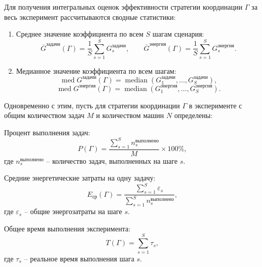 Для получения интегральных оценок эффективности стратегии координации $\Gamma$ за весь эксперимент рассчитываются сводные статистики:

\begin{enumerate}[beginpenalty=10000, midpenalty=10000, wide=\parindent, leftmargin=0pt]
	\item Среднее значение коэффициента по всем $S$ шагам сценария:
\begin{equation}
	\overline{G}^{\text{задачи}}(\Gamma) = \frac{1}{S} \sum_{s=1}^{S} G^{\text{задачи}}_s, \qquad
	\overline{G}^{\text{энергия}}(\Gamma) = \frac{1}{S} \sum_{s=1}^{S} G^{\text{энергия}}_s.
\end{equation}

	\item Медианное значение коэффициента по всем шагам:
\begin{equation}
	\operatorname{med} G^{\text{задачи}}(\Gamma) = \operatorname{median}\left( G^{\text{задачи}}_1, \dots, G^{\text{задачи}}_S \right),
\end{equation}
\begin{equation}
	\operatorname{med} G^{\text{энергия}}(\Gamma) = \operatorname{median}\left( G^{\text{энергия}}_1, \dots, G^{\text{энергия}}_S \right).
\end{equation}
\end{enumerate}

Одновременно с этим, пусть для стратегии координации $\Gamma$ в эксперименте с общим количеством задач $M$ и количеством машин $N$ определены:

Процент выполнения задач:
\begin{equation}
	P(\Gamma) = \frac{\displaystyle \sum_{s=1}^{S} n_s^{\text{выполнено}}}{M} \times 100\%,
\end{equation}
где $n_s^{\text{выполнено}}$ -- количество задач, выполненных на шаге $s$.

Средние энергетические затраты на одну задачу:
\begin{equation}
	E_{\text{ср}}(\Gamma) = \frac{\displaystyle \sum_{s=1}^{S} \varepsilon_s}{\displaystyle \sum_{s=1}^{S} n_s^{\text{выполнено}}},
\end{equation}
где $\varepsilon_s$ -- общие энергозатраты на шаге $s$.

Общее время выполнения эксперимента:
\begin{equation}
	T(\Gamma) = \sum_{s=1}^{S} \tau_s,
\end{equation}
где $\tau_s$ -- реальное время выполнения шага $s$.

